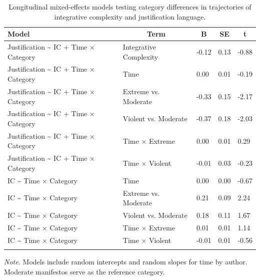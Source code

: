 \documentclass[
  english,
  man,floatsintext]{apa6}
\begin{document}
\begin{table}[tbp]

\begin{center}
\begin{threeparttable}

\caption{\label{tab:longitudinal-category-models}Longitudinal mixed-effects models testing category differences in trajectories of integrative complexity and justification language.}

\begin{tabular}{lllll}
\toprule
Model & \multicolumn{1}{c}{Term} & \multicolumn{1}{c}{B} & \multicolumn{1}{c}{SE} & \multicolumn{1}{c}{t}\\
\midrule
Justification \textasciitilde{} IC + Time × Category & Integrative Complexity & -0.12 & 0.13 & -0.88\\
Justification \textasciitilde{} IC + Time × Category & Time & 0.00 & 0.01 & -0.19\\
Justification \textasciitilde{} IC + Time × Category & Extreme vs. Moderate & -0.33 & 0.15 & -2.17\\
Justification \textasciitilde{} IC + Time × Category & Violent vs. Moderate & -0.37 & 0.18 & -2.03\\
Justification \textasciitilde{} IC + Time × Category & Time × Extreme & 0.00 & 0.01 & 0.29\\
Justification \textasciitilde{} IC + Time × Category & Time × Violent & -0.01 & 0.03 & -0.23\\
IC \textasciitilde{} Time × Category & Time & 0.00 & 0.00 & -0.67\\
IC \textasciitilde{} Time × Category & Extreme vs. Moderate & 0.21 & 0.09 & 2.24\\
IC \textasciitilde{} Time × Category & Violent vs. Moderate & 0.18 & 0.11 & 1.67\\
IC \textasciitilde{} Time × Category & Time × Extreme & 0.01 & 0.01 & 1.14\\
IC \textasciitilde{} Time × Category & Time × Violent & -0.01 & 0.01 & -0.56\\
\bottomrule
\addlinespace
\end{tabular}

\begin{tablenotes}[para]
\normalsize{\textit{Note.} Models include random intercepts and random slopes for time by author. Moderate manifestos serve as the reference category.}
\end{tablenotes}

\end{threeparttable}
\end{center}

\end{table}
\end{document}
